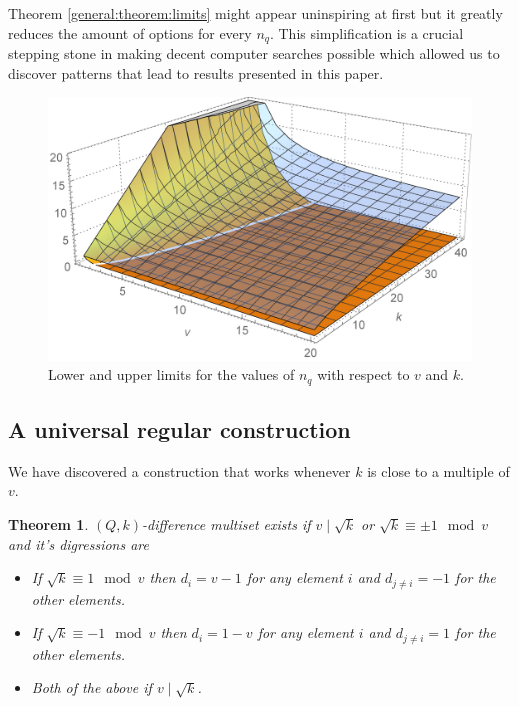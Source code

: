 \documentclass{article}
\theoremstyle{plain}
\newtheorem{theorem}{Theorem}[section]
\theoremstyle{definition}
\theoremstyle{remark}
\begin{document}
            Theorem \ref{general:theorem:limits} might appear uninspiring at first but it greatly reduces the amount of options for every $n_q$. This simplification is a crucial stepping stone in making decent computer searches possible which allowed us to discover patterns that lead to results presented in this paper.
                
            \begin{figure}
                \includegraphics[width=\textwidth]{boundingSurfaces}
                \caption{Lower and upper limits for the values of $n_q$ with respect to $v$ and $k$.}
                \label{general:figure:limits}
            \end{figure}
            
        \subsection{A universal regular construction}
            We have discovered a construction that works whenever $k$ is close to a multiple of $v$.
            
            \begin{theorem}
                \label{regular:theorem:regular}
                $(Q,k)$-difference multiset exists if $v \mid \sqrt k$ or $\sqrt k \equiv \pm 1 \mod v$ and it's digressions are 
                    \begin{itemize}
                        \item If $\sqrt k \equiv 1 \mod v$ then $d_i = v-1$ for any element $i$ and $d_{j \neq i} = -1$ for the other elements.
                        \item If $\sqrt k \equiv -1 \mod v$ then $d_i =1-v$ for any element $i$ and $d_{j \neq i} = 1$ for the other elements.
                        \item Both of the above if $v \mid \sqrt k$.
                    \end{itemize}
            \end{theorem}
            
\end{document}
